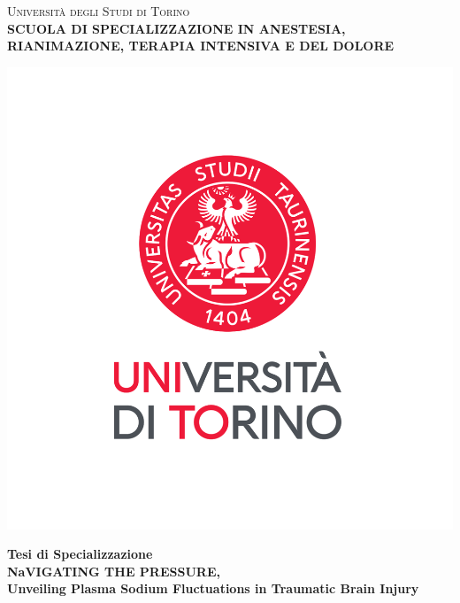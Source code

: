 \begin{titlepage}
    \begin{center}
        {\Large \textsc{Università degli Studi di Torino\\}}
        \vspace{5mm}
        {\small \bf SCUOLA DI SPECIALIZZAZIONE IN ANESTESIA,\\ RIANIMAZIONE, TERAPIA INTENSIVA E DEL DOLORE\\}
        \vspace{5mm}
    \end{center}

    \begin{center}
        \includegraphics[scale=0.8]{head/newlogo.png}
    \end{center}

    \begin{center}
        \vspace{1mm}
        {\large \bf Tesi di Specializzazione\\}
        \vspace{5mm}
        {\LARGE \bf NaVIGATING THE PRESSURE,\\ Unveiling Plasma Sodium Fluctuations in Traumatic Brain Injury\\}
    \end{center}
    

\end{titlepage}
